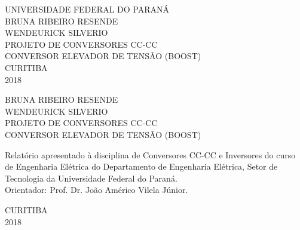 \documentclass[a4paper]{article}
\begin{document}
\onehalfspace
\begin{titlepage}
    \begin{center}
       {\Large UNIVERSIDADE FEDERAL DO PARANÁ}\\[3cm]
       {\Large BRUNA RIBEIRO RESENDE\\[0.5cm]WENDEURICK SILVERIO}\\[8cm]
        {\Large PROJETO DE CONVERSORES CC-CC} \\[0.5cm]
        {\Large CONVERSOR ELEVADOR DE TENSÃO (BOOST)} \\[8cm]
        {\Large CURITIBA\\[0.5cm]2018}
        \vfill
    \end{center}
\end{titlepage}

\begin{titlepage}
    \begin{center}
       
       {\Large BRUNA RIBEIRO RESENDE\\[0.5cm]WENDEURICK SILVERIO}\\[6cm]
        {\Large PROJETO DE CONVERSORES CC-CC} \\[0.5cm]
        
      {\Large CONVERSOR ELEVADOR DE TENSÃO (BOOST)}\\[1cm]
      \end{center}

  \hspace{.6\textwidth} %
   \begin{minipage}{.45\textwidth}
   \large Relatório apresentado à disciplina de Conversores CC-CC e Inversores do curso de Engenharia Elétrica do Departamento de Engenharia Elétrica, Setor de Tecnologia da Universidade Federal do Paraná.\\[0.5cm]
Orientador: Prof. Dr. João Américo Vilela Júnior.\\[6cm]
  \end{minipage}
  \vfill

      \begin{center}
      {\Large CURITIBA\\[0.5cm]2018}
        \vfill
      \end{center}
            
    
\end{titlepage}
\end{document}
